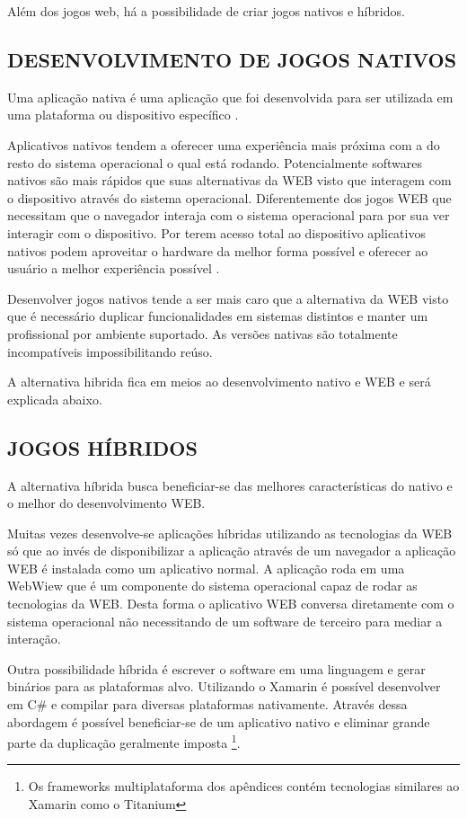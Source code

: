 Além dos jogos web, há a possibilidade de criar jogos nativos e híbridos.

\subsection{DESENVOLVIMENTO DE JOGOS NATIVOS}

Uma aplicação nativa é uma aplicação que foi desenvolvida para ser
utilizada em uma plataforma ou dispositivo específico \autocite[pp.
7]{aSeriousContender}. 

Aplicativos nativos tendem a oferecer uma experiência mais próxima com
a do resto do sistema operacional o qual está rodando. Potencialmente
softwares nativos são mais rápidos que suas alternativas da WEB
visto que interagem com o dispositivo através do sistema operacional.
Diferentemente dos jogos WEB que necessitam que o navegador interaja com
o sistema operacional para por sua ver interagir com o dispositivo. Por
terem acesso total ao dispositivo aplicativos nativos podem aproveitar
o hardware da melhor forma possível e oferecer ao usuário a melhor
experiência possível \autocite[pp. 7]{aSeriousContender}.

Desenvolver jogos nativos tende a ser mais caro que a alternativa da WEB
visto que é necessário duplicar funcionalidades em sistemas distintos
e manter um profissional por ambiente suportado. As versões nativas
são totalmente incompatíveis impossibilitando reúso.

A alternativa hibrida fica em meios ao desenvolvimento nativo e WEB e
será explicada abaixo.

\subsection{JOGOS HÍBRIDOS}

A alternativa híbrida busca beneficiar-se das melhores características
do nativo e o melhor do desenvolvimento WEB.

Muitas vezes desenvolve-se aplicações híbridas utilizando as
tecnologias da WEB só que ao invés de disponibilizar a aplicação
através de um navegador a aplicação WEB é instalada como um
aplicativo normal. A aplicação roda em uma WebWiew que é um
componente do sistema operacional capaz de rodar as tecnologias da
WEB. Desta forma o aplicativo WEB conversa diretamente com o sistema
operacional não necessitando de um software de terceiro para mediar a
interação.

Outra possibilidade híbrida é escrever o software em uma linguagem
e gerar binários para as plataformas alvo. Utilizando o Xamarin é
possível desenvolver em C\# e compilar para diversas plataformas
nativamente. Através dessa abordagem é possível beneficiar-se de um
aplicativo nativo e eliminar grande parte da duplicação geralmente
imposta \footnote{Os frameworks multiplataforma dos apêndices contém
tecnologias similares ao Xamarin como o Titanium}.

